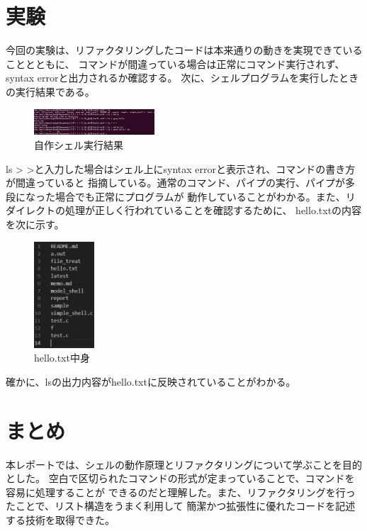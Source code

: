 \documentclass[a4j, twocolumn]{ltjsarticle}
\begin{document}
      \section{実験}
      今回の実験は、リファクタリングしたコードは本来通りの動きを実現できていることとともに、
      コマンドが間違っている場合は正常にコマンド実行されず、syntax errorと出力されるか確認する。
      次に、シェルプログラムを実行したときの実行結果である。
      \begin{figure}[h]
        \centering
        \includegraphics[width=0.4\textwidth]{image/シェル実行結果.png} %
        \caption{自作シェル実行結果}
        \label{fig:自作シェル実行結果}
      \end{figure}
      ls > >と入力した場合はシェル上にsyntax errorと表示され、コマンドの書き方が間違っていると
      指摘している。通常のコマンド、パイプの実行、パイプが多段になった場合でも正常にプログラムが
      動作していることがわかる。また、リダイレクトの処理が正しく行われていることを確認するために、
      hello.txtの内容を次に示す。
      
      \begin{figure}[h]
        \centering
        \includegraphics[width=0.2\textwidth]{image/ls実行結果.png} %
        \caption{hello.txt中身}
        \label{fig:hello.txt中身}
      \end{figure}
      確かに、lsの出力内容がhello.txtに反映されていることがわかる。

      \section{まとめ}
      本レポートでは、シェルの動作原理とリファクタリングについて学ぶことを目的とした。
      空白で区切られたコマンドの形式が定まっていることで、コマンドを容易に処理することが
      できるのだと理解した。また、リファクタリングを行ったことで、リスト構造をうまく利用して
      簡潔かつ拡張性に優れたコードを記述する技術を取得できた。
\end{document}
